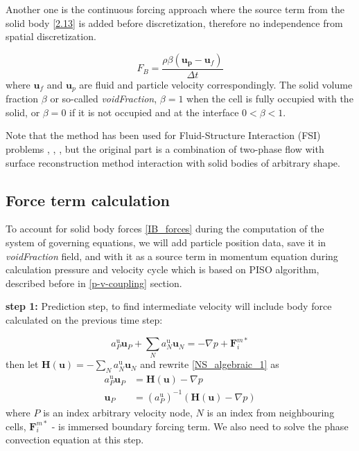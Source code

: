 Another one is the continuous forcing approach \cite{mittal2005immersed} where the source term from the solid body \ref{2.13} is added before discretization, therefore no independence from spatial discretization.

\begin{equation}\label{2.13}
F_{B}=\frac{\rho \beta \left(\mathbf{u}_{\mathbf{p}}-\mathbf{u}_f\right)}{ \Delta t}
\end{equation}
where $\mathbf{u}_f$ and $\mathbf{u}_p$ are fluid and particle velocity correspondingly. The solid volume fraction $\beta$ or so-called \textit{voidFraction}, $\beta = 1$ when the cell is fully occupied with the solid, or $\beta = 0$ if it is not occupied and at the interface $0 < \beta < 1$.

Note that the method has been used for Fluid-Structure Interaction (FSI) problems \cite{blais2016semi}, \cite{nan2023high}, \cite{mao2020resolved}, but the original part is a combination of two-phase flow with surface reconstruction method interaction with solid bodies of arbitrary shape. 

\subsection{Force term calculation}

To account for solid body forces \ref{IB_forces} during the computation of the system of governing equations, we will add particle position data, save it in \textit{voidFraction} field, and with it as a source term in momentum equation during calculation pressure and velocity cycle which is based on PISO algorithm, described before in \ref{p-v-coupling} section.

\textbf{step 1:} Prediction step, to find intermediate velocity will include body force calculated on the previous time step:

\begin{equation}\label{NS_algebraic_1}
    a_{P}^{\mathrm{u}} \mathbf{u}_{P}+\sum_{N} a_{N}^{\mathrm{u}} \mathbf{u}_{N}= -\nabla p + \mathbf{F}^{m*}_i
\end{equation}
then let $\mathbf{H}(\mathbf{u})= -\sum_{N} a_{N}^{\mathrm{u}} \mathbf{u}_{N}$ and rewrite \ref{NS_algebraic_1} as
\begin{equation}\label{NS_algebraic_2}
    \begin{aligned}
a_{P}^{\mathrm{u}} \mathbf{u}_{P} &=\mathbf{H}(\mathbf{u})-\nabla p \\
\mathbf{u}_{P} &=\left(a_{P}^{\mathrm{u}}\right)^{-1}(\mathbf{H}(\mathbf{u})-\nabla p)
\end{aligned}
\end{equation}
where $P$ is an index arbitrary velocity node, $N$ is an index from neighbouring cells, $\mathbf{F}^{m*}_i$ - is immersed boundary forcing term. We also need to solve the phase convection equation at this step.

